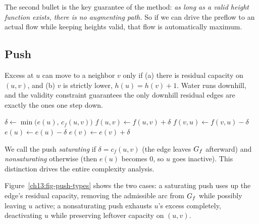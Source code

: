 The second bullet is the key guarantee of the method: \emph{as long as a valid height function exists, there is no augmenting path.} So if we can drive the preflow to an actual flow while keeping heights valid, that flow is automatically maximum.

\subsection*{Push}

Excess at $u$ can move to a neighbor $v$ only if (a) there is residual capacity on $(u,v)$, and (b) $v$ is strictly lower, $h(u)=h(v)+1$. Water runs downhill, and the validity constraint guarantees the only downhill residual edges are exactly the ones one step down.

\begin{algorithm}[H]
\caption{$\textsc{Push}(u,v)$ -- applies when $e(u)>0$, $c_f(u,v)>0$, $h(u)=h(v)+1$}
\label{ch13:alg-push}
\DontPrintSemicolon
$\delta \gets \min\bigl(e(u),\, c_f(u,v)\bigr)$\;
$f(u,v) \gets f(u,v) + \delta$\;
$f(v,u) \gets f(v,u) - \delta$ 
$e(u) \gets e(u) - \delta$\;
$e(v) \gets e(v) + \delta$\;
\end{algorithm}

We call the push \emph{saturating} if $\delta=c_f(u,v)$ (the edge leaves $G_f$ afterward) and \emph{nonsaturating} otherwise (then $e(u)$ becomes $0$, so $u$ goes inactive). This distinction drives the entire complexity analysis.

Figure~\ref{ch13:fig-push-types} shows the two cases: a saturating push uses up the edge's residual capacity, removing the admissible arc from $G_f$ while possibly leaving $u$ active; a nonsaturating push exhausts $u$'s excess completely, deactivating $u$ while preserving leftover capacity on $(u,v)$.

